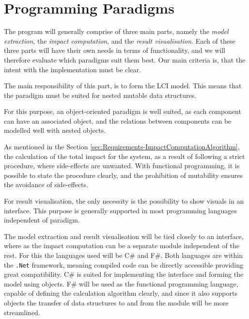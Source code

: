 \section{Programming Paradigms} \label{sec:ProgrammingParadigms}

The program will generally comprise of three main parts, namely the \emph{model extraction}, the \emph{impact computation}, and the \emph{result visualisation}. Each of these three parts will have their own needs in terms of functionality, and we will therefore evaluate which paradigms suit them best. Our main criteria is, that the intent with the implementation must be clear.

The main responsibility of this part, is to form the LCI model. This means that the paradigm must be suited for nested mutable data structures. 

For this purpose, an object-oriented paradigm is well suited, as each component can have an associated object, and the relations between components can be modelled well with nested objects.

\pagebreak{}
As mentioned in the Section \ref{sec:Requirements-ImpactComputationAlgorithm}, the calculation of the total impact for the system, as a result of following a strict procedure, where side-effects are unwanted. With functional programming, it is possible to state the procedure clearly, and the prohibition of mutability ensures the avoidance of side-effects.

For result visualisation, the only necessity is the possibility to show visuals in an interface. This purpose is generally supported in most programming languages independent of paradigm. 

\vspace{1cm}
The model extraction and result visualisation will be tied closely to an interface, where as the impact computation can be a separate module independent of the rest. For this the languages used will be C\# and F\#. Both languages are within the \texttt{.Net} framework, meaning compiled code can be directly accessible providing great compatibility. C\# is suited for implementing the interface and forming the model using objects. F\# will be used as the functional programming language, capable of defining the calculation algorithm clearly, and since it also supports objects the transfer of data structures to and from the module will be more streamlined. 